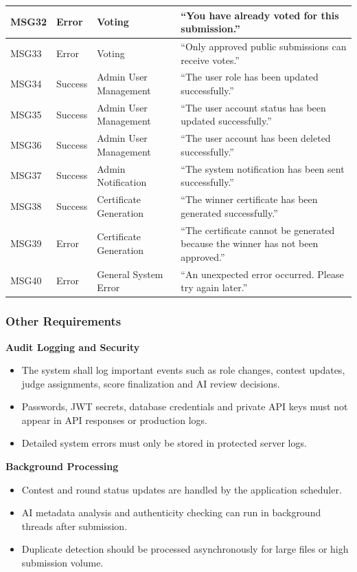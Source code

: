 \begin{longtable}{|>{\centering\arraybackslash}p{}|>{\centering\arraybackslash}p{}|>{\raggedright\arraybackslash}p{}|>{\raggedright\arraybackslash}p{}|}
\hline
MSG32 & Error & Voting & ``You have already voted for this submission.'' \\
\hline
MSG33 & Error & Voting & ``Only approved public submissions can receive votes.'' \\
\hline
MSG34 & Success & Admin User Management & ``The user role has been updated successfully.'' \\
\hline
MSG35 & Success & Admin User Management & ``The user account status has been updated successfully.'' \\
\hline
MSG36 & Success & Admin User Management & ``The user account has been deleted successfully.'' \\
\hline
MSG37 & Success & Admin Notification & ``The system notification has been sent successfully.'' \\
\hline
MSG38 & Success & Certificate Generation & ``The winner certificate has been generated successfully.'' \\
\hline
MSG39 & Error & Certificate Generation & ``The certificate cannot be generated because the winner has not been approved.'' \\
\hline
MSG40 & Error & General System Error & ``An unexpected error occurred. Please try again later.'' \\
\hline
\end{longtable}

\subsubsection{Other Requirements}
\label{subsubsec:other-requirements}

\textbf{Audit Logging and Security}
\begin{itemize}[leftmargin=1.5em, nosep]
    \item The system shall log important events such as role changes, contest updates, judge assignments, score finalization and AI review decisions.
    \item Passwords, JWT secrets, database credentials and private API keys must not appear in API responses or production logs.
    \item Detailed system errors must only be stored in protected server logs.
\end{itemize}

\vspace{0.5em}
\textbf{Background Processing}
\begin{itemize}[leftmargin=1.5em, nosep]
    \item Contest and round status updates are handled by the application scheduler.
    \item AI metadata analysis and authenticity checking can run in background threads after submission.
    \item Duplicate detection should be processed asynchronously for large files or high submission volume.
\end{itemize}

